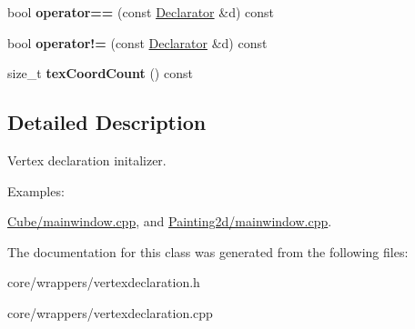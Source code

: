 \begin{DoxyCompactItemize}
\item 
\hypertarget{class_tempest_1_1_vertex_declaration_1_1_declarator_a9c58993ee13c95e92637acc1a08bf525}{bool {\bfseries operator==} (const \hyperlink{class_tempest_1_1_vertex_declaration_1_1_declarator}{Declarator} \&d) const }\label{class_tempest_1_1_vertex_declaration_1_1_declarator_a9c58993ee13c95e92637acc1a08bf525}

\item 
\hypertarget{class_tempest_1_1_vertex_declaration_1_1_declarator_a9652cc838c7d38c5895ecd04d2f87f70}{bool {\bfseries operator!=} (const \hyperlink{class_tempest_1_1_vertex_declaration_1_1_declarator}{Declarator} \&d) const }\label{class_tempest_1_1_vertex_declaration_1_1_declarator_a9652cc838c7d38c5895ecd04d2f87f70}

\item 
\hypertarget{class_tempest_1_1_vertex_declaration_1_1_declarator_a1a31edd086b4c7ac6065a45808ce88dc}{size\+\_\+t {\bfseries tex\+Coord\+Count} () const }\label{class_tempest_1_1_vertex_declaration_1_1_declarator_a1a31edd086b4c7ac6065a45808ce88dc}

\end{DoxyCompactItemize}


\subsection{Detailed Description}
Vertex declaration initalizer. \begin{Desc}
\item[Examples\+: ]\par
\hyperlink{_cube_2mainwindow_8cpp-example}{Cube/mainwindow.\+cpp}, and \hyperlink{_painting2d_2mainwindow_8cpp-example}{Painting2d/mainwindow.\+cpp}.\end{Desc}


The documentation for this class was generated from the following files\+:\begin{DoxyCompactItemize}
\item 
core/wrappers/vertexdeclaration.\+h\item 
core/wrappers/vertexdeclaration.\+cpp\end{DoxyCompactItemize}
